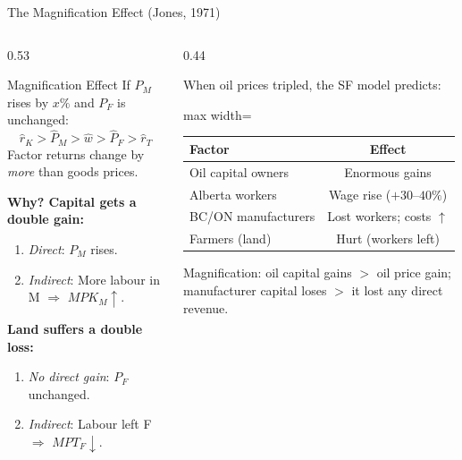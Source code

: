 \documentclass[aspectratio=169]{beamer}
\begin{document}
\begin{frame}{The Magnification Effect (Jones, 1971)}
\begin{columns}[T]
\begin{column}{0.53\textwidth}
\begin{block}{Magnification Effect}
If $P_M$ rises by $x\%$ and $P_F$ is unchanged:
\[\hat{r}_K > \hat{P}_M > \hat{w} > \hat{P}_F
  > \hat{r}_T\]
Factor returns change by \emph{more} than goods prices.
\end{block}
\vspace{0.3em}
\textbf{Why?  Capital gets a double gain:}
\begin{enumerate}\small
  \item \emph{Direct}: $P_M$ rises.
  \item \emph{Indirect}: More labour in M
        $\Rightarrow$ $MPK_M\uparrow$.
\end{enumerate}
\textbf{Land suffers a double loss:}
\begin{enumerate}\small
  \item \emph{No direct gain}: $P_F$ unchanged.
  \item \emph{Indirect}: Labour left F
        $\Rightarrow$ $MPT_F\downarrow$.
\end{enumerate}
\end{column}
\begin{column}{0.44\textwidth}
\begin{canadex}
\footnotesize When oil prices tripled, the SF model
predicts:
\vspace{0.2em}
\begin{adjustbox}{max width=\columnwidth}
\begin{tabular}{lc}
\toprule
\textbf{Factor} & \textbf{Effect}\\
\midrule
Oil capital owners & Enormous gains\\
Alberta workers & Wage rise ($+30$--$40\%$)\\
BC/ON manufacturers & Lost workers; costs $\uparrow$\\
Farmers (land) & Hurt (workers left)\\
\bottomrule
\end{tabular}
\end{adjustbox}
\vspace{0.2em}
Magnification: oil capital gains $>$ oil price gain;
manufacturer capital loses $>$ it lost any direct
revenue.
\end{canadex}
\end{column}
\end{columns}
\end{frame}
\end{document}
